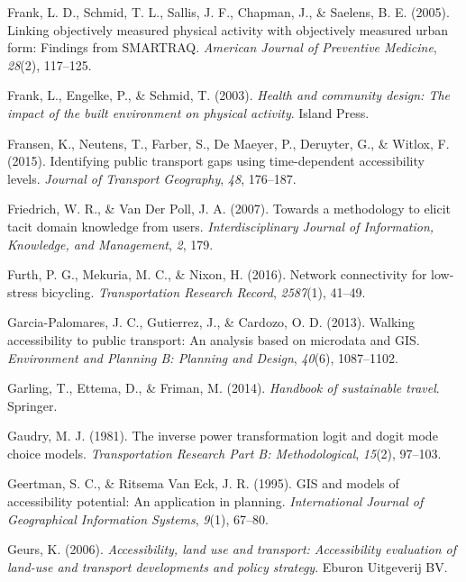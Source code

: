 \documentclass[
11pt, %
oneside, %
english, %
singlespacing, %
]{macthesis} %
\newlength{\cslhangindent}
\newenvironment{CSLReferences}[2] %
 {%
  \setlength{\parindent}{0pt}
  \ifodd #1 \everypar{\setlength{\hangindent}{\cslhangindent}}\ignorespaces\fi
  \ifnum #2 > 0
  \setlength{\parskip}{#2\baselineskip}
  \fi
 }%
 {}
\begin{document}
\begin{CSLReferences}{1}{0}
Frank, L. D., Schmid, T. L., Sallis, J. F., Chapman, J., \& Saelens, B. E. (2005). Linking objectively measured physical activity with objectively measured urban form: Findings from SMARTRAQ. \emph{American Journal of Preventive Medicine}, \emph{28}(2), 117--125.

Frank, L., Engelke, P., \& Schmid, T. (2003). \emph{Health and community design: The impact of the built environment on physical activity}. Island Press.

Fransen, K., Neutens, T., Farber, S., De Maeyer, P., Deruyter, G., \& Witlox, F. (2015). Identifying public transport gaps using time-dependent accessibility levels. \emph{Journal of Transport Geography}, \emph{48}, 176--187.

Friedrich, W. R., \& Van Der Poll, J. A. (2007). Towards a methodology to elicit tacit domain knowledge from users. \emph{Interdisciplinary Journal of Information, Knowledge, and Management}, \emph{2}, 179.

Furth, P. G., Mekuria, M. C., \& Nixon, H. (2016). Network connectivity for low-stress bicycling. \emph{Transportation Research Record}, \emph{2587}(1), 41--49.

Garcia-Palomares, J. C., Gutierrez, J., \& Cardozo, O. D. (2013). Walking accessibility to public transport: An analysis based on microdata and GIS. \emph{Environment and Planning B: Planning and Design}, \emph{40}(6), 1087--1102.

Garling, T., Ettema, D., \& Friman, M. (2014). \emph{Handbook of sustainable travel}. Springer.

Gaudry, M. J. (1981). The inverse power transformation logit and dogit mode choice models. \emph{Transportation Research Part B: Methodological}, \emph{15}(2), 97--103.

Geertman, S. C., \& Ritsema Van Eck, J. R. (1995). GIS and models of accessibility potential: An application in planning. \emph{International Journal of Geographical Information Systems}, \emph{9}(1), 67--80.

Geurs, K. (2006). \emph{Accessibility, land use and transport: Accessibility evaluation of land-use and transport developments and policy strategy}. Eburon Uitgeverij BV.


\end{CSLReferences}
\end{document}
